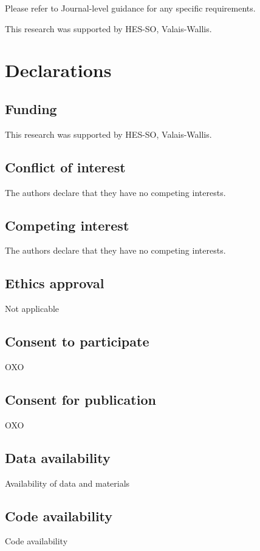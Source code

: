 \documentclass[sn-mathphys,Numbered]{sn-jnl}%
\theoremstyle{thmstyleone}%
\theoremstyle{thmstyletwo}%
\theoremstyle{thmstylethree}%
\begin{document}
Please refer to Journal-level guidance for any specific requirements.



This research was supported by HES-SO, Valais-Wallis. 

%
%
%
\section*{Declarations}
%
\subsection*{Funding}
%
This research was supported by HES-SO, Valais-Wallis. 
%
%
%
\subsection*{Conflict of interest}
%
The authors declare that they have no competing interests.
%
%
%
\subsection*{Competing interest}
%
The authors declare that they have no competing interests.
%
%
%
\subsection*{Ethics approval}
%
Not applicable
%
%
%
\subsection*{Consent to participate}
%
OXO
%
%
%
\subsection*{Consent for publication}
%
OXO
%
%
%
\subsection*{Data availability}
%
Availability of data and materials
%
%
%
\subsection*{Code availability}
%
Code availability 
%
%
%
\end{document}

